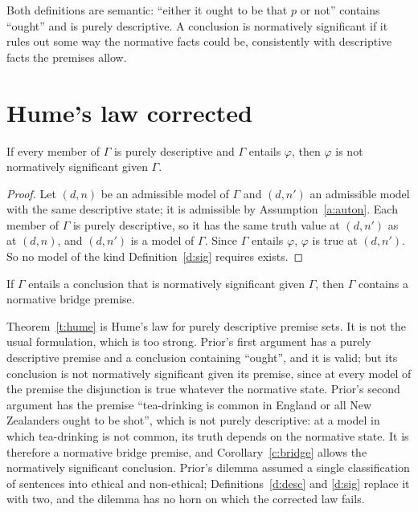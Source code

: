\documentclass{situationist-preprint}
\begin{document}
Both definitions are semantic: \enquote{either it ought to be that $p$ or not} contains \enquote{ought} and is purely descriptive. A conclusion is normatively significant if it rules out some way the normative facts could be, consistently with descriptive facts the premises allow.

\section{Hume's law corrected}

\begin{theorem}\label{t:hume}
If every member of $\Gamma$ is purely descriptive and $\Gamma$ entails $\varphi$, then $\varphi$ is not normatively significant given $\Gamma$.
\end{theorem}

\begin{proof}
Let $(d,n)$ be an admissible model of $\Gamma$ and $(d,n')$ an admissible model with the same descriptive state; it is admissible by Assumption~\ref{a:auton}. Each member of $\Gamma$ is purely descriptive, so it has the same truth value at $(d,n')$ as at $(d,n)$, and $(d,n')$ is a model of $\Gamma$. Since $\Gamma$ entails $\varphi$, $\varphi$ is true at $(d,n')$. So no model of the kind Definition~\ref{d:sig} requires exists.
\end{proof}

\begin{corollary}\label{c:bridge}
If $\Gamma$ entails a conclusion that is normatively significant given $\Gamma$, then $\Gamma$ contains a normative bridge premise.
\end{corollary}

Theorem~\ref{t:hume} is Hume's law for purely descriptive premise sets. It is not the usual formulation, which is too strong. Prior's first argument has a purely descriptive premise and a conclusion containing \enquote{ought}, and it is valid; but its conclusion is not normatively significant given its premise, since at every model of the premise the disjunction is true whatever the normative state. Prior's second argument has the premise \enquote{tea-drinking is common in England or all New Zealanders ought to be shot}, which is not purely descriptive: at a model in which tea-drinking is not common, its truth depends on the normative state. It is therefore a normative bridge premise, and Corollary~\ref{c:bridge} allows the normatively significant conclusion. Prior's dilemma assumed a single classification of sentences into ethical and non-ethical; Definitions~\ref{d:desc} and \ref{d:sig} replace it with two, and the dilemma has no horn on which the corrected law fails.
\end{document}
